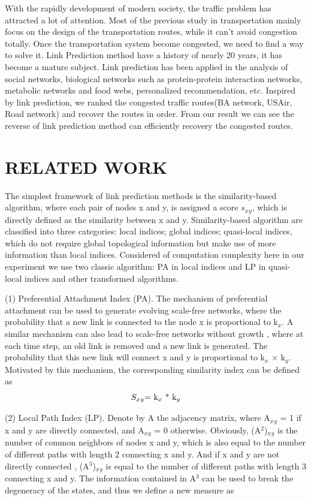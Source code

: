 \documentclass[onecolumn,preprintnumbers,amsmath,amssymb]{revtex4}
\begin{document}
With the rapidly development of modern society, the traffic problem has attracted a lot of attention. Most of the previous study in transportation mainly focus on the design of the transportation routes, while it can't avoid congestion totally. Once the transportation system become congested, we need to find a way to solve it. Link Prediction method have a history of nearly 20 years, it has become a mature subject.
Link prediction has been applied in the analysis of social networks, biological networks such as protein-protein interaction networks, metabolic networks and food webs, personalized recommendation, etc\cite{NHS,TOM,SPR,TZ,SAD,CAA}. Inspired by link prediction, we ranked the congested traffic routes(BA network, USAir, Road network) and recover the routes in order. From our result we can see the reverse of link prediction method can efficiently recovery the congested routes.


\section*{RELATED WORK\protect}
The simplest framework of link prediction methods is the similarity-based algorithm, where each pair of nodes x and y, is assigned a score $s_x$$_y$, which is directly defined as the similarity between x and y. Similarity-based algorithm are classified into three categories: local indices; global indices; quasi-local indices, which do not require global topological information but make use of more information than local indices\cite{SV}. Considered of computation complexity here in our experiment we use two classic algorithm: PA in local indices and LP in quasi-local indices and other transformed algorithms.

(1) Preferential Attachment Index (PA)\cite{WG}. The mechanism of preferential attachment can be used to generate evolving scale-free networks, where the probability that a new link is connected to the node x is proportional to k$_x$. A similar mechanism can also lead to scale-free networks without growth , where at each time step, an old link is removed and a new link is generated. The probability that this new link will connect x and y is proportional to k$_x$ × k$_y$. Motivated by this mechanism, the corresponding similarity index can be defined as
\begin{equation}
\centerline{
$S_x$$_y$=
k$_x$ * k$_y$
}
\end{equation}


(2) Local Path Index (LP)\cite{AC,LI}. Denote by A the adjacency matrix, where A$_x$$_y$ = 1 if x and y are directly connected, and A$_x$$_y$ = 0 otherwise. Obviously, (A$^2$)$_x$$_y$ is the number of common neighbors of nodes x and y, which is also equal to the number of different paths with length 2 connecting x and y. And if x and y are not directly connected , (A$^3$)$_x$$_y$ is equal to the number of different paths with length 3 connecting x and y. The information contained in A$^3$ can be used to break the degeneracy of the states, and thus we define a new measure as
\end{document}

